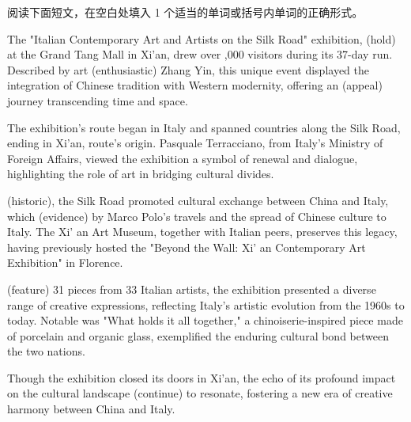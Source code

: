 \documentclass{英语试卷}
\begin{document}
\par 阅读下面短文，在空白处填入 1 个适当的单词或括号内单词的正确形式。\par
\par The "Italian Contemporary Art and Artists on the Silk Road" exhibition,  (hold) at the Grand Tang Mall in Xi'an, drew over ,000 visitors during its 37-day run. Described by art  (enthusiastic) Zhang Yin, this unique event displayed the integration of Chinese tradition with Western modernity, offering an  (appeal) journey transcending time and space.\par
\par The exhibition's route began in Italy and spanned countries along the Silk Road, ending in Xi'an,  route's origin. Pasquale Terracciano, from Italy's Ministry of Foreign Affairs, viewed the exhibition  a symbol of renewal and dialogue, highlighting the role of art in bridging cultural divides.\par
\par {} (historic), the Silk Road promoted cultural exchange between China and Italy, which (evidence) by Marco Polo's travels and the spread of Chinese culture to Italy. The Xi' an Art Museum, together with Italian peers, preserves this legacy, having previously hosted the "Beyond the Wall: Xi' an Contemporary Art Exhibition" in Florence.\par
\par {} (feature) 31 pieces from 33 Italian artists, the exhibition presented a diverse range of creative expressions, reflecting Italy's artistic evolution from the 1960s to today. Notable was "What holds it all together," a chinoiserie-inspired piece made of porcelain and organic glass,  exemplified the enduring cultural bond between the two nations.\par
\par Though the exhibition closed its doors in Xi'an, the echo of its profound impact on the cultural landscape  (continue) to resonate, fostering a new era of creative harmony between China and Italy.\par
\end{document}
